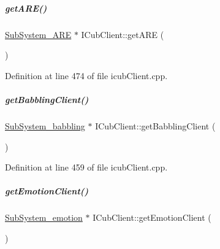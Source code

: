 \mbox{\label{group__icubclient__clients_ad022d3754041d652ebc37044c7be047c}} 
\subparagraph{\texorpdfstring{get\+A\+R\+E()}{getARE()}}
{\footnotesize\ttfamily \hyperlink{group__icubclient__subsystems_classicubclient_1_1SubSystem__ARE}{Sub\+System\+\_\+\+A\+RE} $\ast$ I\+Cub\+Client\+::get\+A\+RE (\begin{DoxyParamCaption}{ }\end{DoxyParamCaption})}



Definition at line 474 of file icub\+Client.\+cpp.

\mbox{\label{group__icubclient__clients_a25bc61a476eae941aa5a25cd5d21a0d2}} 
\subparagraph{\texorpdfstring{get\+Babbling\+Client()}{getBabblingClient()}}
{\footnotesize\ttfamily \hyperlink{group__icubclient__subsystems_classicubclient_1_1SubSystem__babbling}{Sub\+System\+\_\+babbling} $\ast$ I\+Cub\+Client\+::get\+Babbling\+Client (\begin{DoxyParamCaption}{ }\end{DoxyParamCaption})}



Definition at line 459 of file icub\+Client.\+cpp.

\mbox{\label{group__icubclient__clients_afbb986e5685fe8d66784217a6f6b0230}} 
\subparagraph{\texorpdfstring{get\+Emotion\+Client()}{getEmotionClient()}}
{\footnotesize\ttfamily \hyperlink{group__icubclient__subsystems_classicubclient_1_1SubSystem__emotion}{Sub\+System\+\_\+emotion} $\ast$ I\+Cub\+Client\+::get\+Emotion\+Client (\begin{DoxyParamCaption}{ }\end{DoxyParamCaption})}




